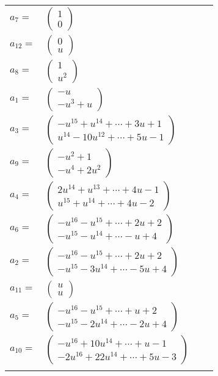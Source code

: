 \documentclass[1p]{elsarticle_modified}
\theoremstyle{definition}
\begin{document}
\begin{tabular}{m{7pt} m{180pt} m{7pt} m{180pt} }
\flushright $a_{7}=$&$\begin{pmatrix}1\\0\end{pmatrix}$ \\
\flushright $a_{12}=$&$\begin{pmatrix}0\\u\end{pmatrix}$ \\
\flushright $a_{8}=$&$\begin{pmatrix}1\\u^2\end{pmatrix}$ \\
\flushright $a_{1}=$&$\begin{pmatrix}- u\\- u^3+u\end{pmatrix}$ \\
\flushright $a_{3}=$&$\begin{pmatrix}- u^{15}+u^{14}+\cdots+3 u+1\\u^{14}-10 u^{12}+\cdots+5 u-1\end{pmatrix}$ \\
\flushright $a_{9}=$&$\begin{pmatrix}- u^2+1\\- u^4+2 u^2\end{pmatrix}$ \\
\flushright $a_{4}=$&$\begin{pmatrix}2 u^{14}+u^{13}+\cdots+4 u-1\\u^{15}+u^{14}+\cdots+4 u-2\end{pmatrix}$ \\
\flushright $a_{6}=$&$\begin{pmatrix}- u^{16}- u^{15}+\cdots+2 u+2\\- u^{15}- u^{14}+\cdots- u+4\end{pmatrix}$ \\
\flushright $a_{2}=$&$\begin{pmatrix}- u^{16}- u^{15}+\cdots+2 u+2\\- u^{15}-3 u^{14}+\cdots-5 u+4\end{pmatrix}$ \\
\flushright $a_{11}=$&$\begin{pmatrix}u\\u\end{pmatrix}$ \\
\flushright $a_{5}=$&$\begin{pmatrix}- u^{16}- u^{15}+\cdots+u+2\\- u^{15}-2 u^{14}+\cdots-2 u+4\end{pmatrix}$ \\
\flushright $a_{10}=$&$\begin{pmatrix}- u^{16}+10 u^{14}+\cdots+u-1\\-2 u^{16}+22 u^{14}+\cdots+5 u-3\end{pmatrix}$\\&\end{tabular}
\end{document}
